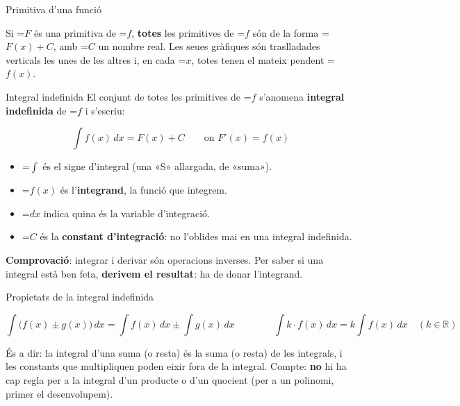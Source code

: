 \documentclass[11pt,a4paper]{article}
\newcommand{\fmm}[1]{\setbox0=\hbox{$#1$}\ifdim\wd0>\linewidth\[#1\]\else\mbox{\box0}\fi}
\newcommand{\fmuline}[1]{\textbf{\color{fmaccent}#1}}
\begin{document}
\begin{fmdef}{Primitiva d'una funció}
      
\begin{fmnote}Si \fmm{F} és una primitiva de \fmm{f}, \textbf{totes} les primitives de \fmm{f} són de la forma \fmm{F(x)+C}, amb \fmm{C} un nombre real. Les seues gràfiques són traslladades verticals les unes de les altres i, en cada \fmm{x}, totes tenen el mateix pendent \fmm{f(x)}.\end{fmnote}
\end{fmdef}

  
\begin{fmdef}{Integral indefinida}
El conjunt de totes les primitives de \fmm{f} s'anomena \textbf{integral indefinida} de \fmm{f} i s'escriu:

      
\[\int f(x)\,dx=F(x)+C\qquad\text{on }F'(x)=f(x)\]

      
\begin{itemize}
\item \fmm{\int} és el signe d'integral (una «S» allargada, de «suma»).
\item \fmm{f(x)} és l'\textbf{integrand}, la funció que integrem.
\item \fmm{dx} indica quina és la variable d'integració.
\item \fmm{C} és la \textbf{constant d'integració}: no l'oblides mai en una integral indefinida.
\end{itemize}

      
\begin{fmnote}\fmuline{Comprovació}: integrar i derivar són operacions inverses. Per saber si una integral està ben feta, \textbf{derivem el resultat}: ha de donar l'integrand.\end{fmnote}
\end{fmdef}

  
\begin{fmprop}{Propietats de la integral indefinida}

\[\int\big(f(x)\pm g(x)\big)\,dx=\int f(x)\,dx\pm\int g(x)\,dx\qquad\qquad\int k\cdot f(x)\,dx=k\int f(x)\,dx\quad(k\in\mathbb R)\]

      

És a dir: la integral d'una suma (o resta) és la suma (o resta) de les integrals, i les constants que multipliquen poden eixir fora de la integral. Compte: \textbf{no} hi ha cap regla per a la integral d'un producte o d'un quocient (per a un polinomi, primer el desenvolupem).
\end{fmprop}
\end{document}
